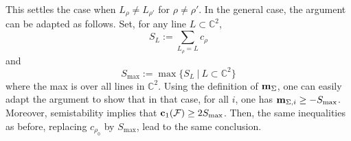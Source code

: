 \documentclass[a4paper,10pt]{amsart}
\theoremstyle{plain}{
    \newtheorem{theorem}{Theorem}[section]
    \newtheorem{lemma}[theorem]{Lemma}
    \newtheorem{corollary}[theorem]{Corollary}
    \newtheorem{proposition}[theorem]{Proposition}
    \newtheorem{conjecture}[theorem]{Conjecture}
}
\theoremstyle{definition}{
    \newtheorem{definition}[theorem]{Definition}
    \newtheorem{defn-thm}[theorem]{Definition-Theorem}
    \newtheorem{example}[theorem]{Example}
    \newtheorem{notation}[theorem]{Notation}
}
\theoremstyle{remark}{
    \newtheorem{remark}[theorem]{Remark}
    \newtheorem{problem}[theorem]{Problem}
    \newtheorem{question}[theorem]{Question}
}
\def\um{{\bf m}}
\def\uc{{\bf c}}
\def\cF{\mathcal{F}}
\def\cE{\mathcal{E}}
\def\cQ{\mathcal{Q}}
\def\C{\mathbb{C}}
\begin{document}
This settles the case when $L_\rho\neq L_{\rho'}$ for $\rho\neq \rho'$. In the general case, the argument can be adapted as follows. Set, for any line $L\subset \C^2$, 
$$S_L:=\sum_{L_\rho=L} c_\rho$$ and
$$
S_{\max}:=\max\lbrace S_L\:\vert\: L\subset \C^2 \rbrace
$$
where the max is over all lines in $\C^2$. Using the definition of $\um_\Sigma$, one can easily adapt the argument to show that in that case, for all $i$, one has $\um_{\Sigma,i}\geq -S_{\max}$. Moreover, semistability implies that $\uc_1(\cF)\geq 2S_{\max}$. Then, the same inequalities as before, replacing $c_{\rho_0}$ by $S_{\max}$, lead to the same conclusion.

\end{document}
